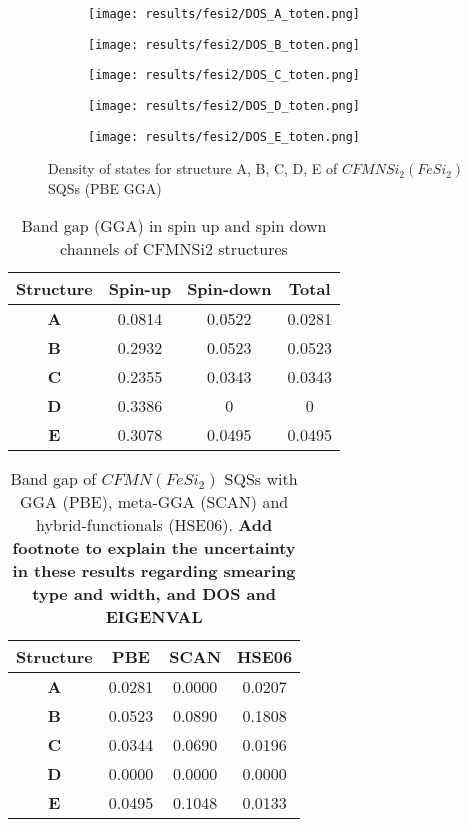 \begin{figure}[H]
\begin{subfigure}{0.5\textwidth}
\texttt{[image: results/fesi2/DOS\_A\_toten.png]}
\end{subfigure}
\begin{subfigure}{0.5\textwidth}
\texttt{[image: results/fesi2/DOS\_B\_toten.png]}
\end{subfigure}
\begin{subfigure}{0.5\textwidth}
\texttt{[image: results/fesi2/DOS\_C\_toten.png]}
\end{subfigure}
\begin{subfigure}{0.5\textwidth}
\texttt{[image: results/fesi2/DOS\_D\_toten.png]}
\end{subfigure}
\begin{subfigure}{0.5\textwidth}
\texttt{[image: results/fesi2/DOS\_E\_toten.png]}
\end{subfigure}
\caption{Density of states for structure A, B, C, D, E of $CFMNSi_2 (FeSi_2)$ SQSs (PBE GGA)}
\label{dos_fesi2_gga}
\end{figure}

\begin{table}[H]
\centering
\begin{tabular}{@{}cccc@{}}
\toprule
Structure  & Spin-up & Spin-down & Total  \\ \midrule
\textbf{A} & 0.0814  & 0.0522    & 0.0281 \\
\textbf{B} & 0.2932  & 0.0523    & 0.0523 \\
\textbf{C} & 0.2355  & 0.0343    & 0.0343 \\
\textbf{D} & 0.3386  & 0         & 0      \\
\textbf{E} & 0.3078  & 0.0495    & 0.0495 \\ \bottomrule
\end{tabular}
\caption{Band gap (GGA) in spin up and spin down channels of CFMNSi2 structures}
\end{table}

\begin{table}[H]
\centering
\begin{tabular}{@{}cccc@{}}
\toprule
Structure  & PBE    & SCAN   & HSE06  \\ \midrule
\textbf{A} & 0.0281 & 0.0000 & 0.0207 \\
\textbf{B} & 0.0523 & 0.0890 & 0.1808 \\
\textbf{C} & 0.0344 & 0.0690 & 0.0196 \\
\textbf{D} & 0.0000 & 0.0000 & 0.0000 \\
\textbf{E} & 0.0495 & 0.1048 & 0.0133 \\ \bottomrule
\end{tabular}
\caption{Band gap of $CFMN (FeSi_2)$ SQSs with GGA (PBE), meta-GGA (SCAN) and hybrid-functionals (HSE06). \textbf{Add footnote to explain the uncertainty in these results regarding smearing type and width, and DOS and EIGENVAL}}
\end{table}

